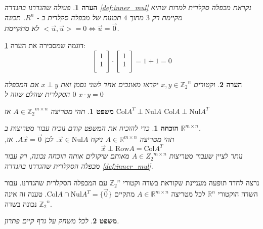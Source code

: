 \documentclass[12pt,leqno]{article}
\theoremstyle{theoremdd}
\newtheorem{theorem}{משפט}[section]
\newtheorem{comm}{הערה}[section]
\newtheorem*{prove}{הוכחה}
\newcommand{\Zn}{{\mathbb{Z}_2}^n}
\newcommand{\Col}{\mathrm{Col}}
\newcommand{\Nul}{\mathrm{Nul}}
\begin{document}
\begin{comm}
    \label{comm:not_really_inner_mul}
    פעולה שהגדרנו 
    בהגדרה 
    \ref{def:inner_mul}
    נקראת 
    מכפלה סקלרית
    למרות שהיא
    מקיימת רק 
    $3$
    מתוך 
    $4$
    תכונות של מכפלה סקלרית ב
    -
    $R^n$.   
    תכונה 
    $<\vec{u},\vec{u}> = 0 \Leftrightarrow \vec{u} = \vec{0} $
    לא מתקיימת.
\end{comm}
דוגמה 
שמסבירה את הערה
\ref{comm:not_really_inner_mul}:
\[
    \begin{bmatrix}
    1 \\
    1 \\
    \end{bmatrix}    
    \cdot 
    \begin{bmatrix}
    1 \\
    1 \\
    \end{bmatrix} 
    = 1 + 1 = 0
\]
\begin{comm}
    וקטורים 
    $x, y \in \Zn $
    יקראו מאונכים אחד לשני נסמן זאת 
    $x \perp  y$
    אם המכפלה הסקלרית שהלם שווה 
    ל
    $0$
    $x \cdot y = 0$
\end{comm}
\begin{theorem}
    \label{the: Nul A and Col AT}
    תהי מטריצה 
    $A \in {\mathbb{Z}_2}^{m \times n }$
    אז 
    $\Col A^T \perp \Nul A$
    $\Col A \perp \Nul A^T$
\end{theorem}
\begin{prove}
    כדי להוכיח את המשפט קודם 
    נוכיח 
    עבור מטריצות ב
    $\mathbb{R}^{m \times n}$.
    \\
    תהי 
    מטריצה
    $A \in \mathbb{R}^{m \times n}$
    ניקח 
    $\vec x \in \mathrm{Nul} A$.
    לכן
    $A\vec x=\vec 0$. 
    אז,
    \[
        \vec x \perp \mathrm{Row}A=\mathrm{Col} A^T
    \]
    נותר לציין 
    שעבור 
    מטריצות 
    $A \in {Z_2}^{m \times n}$
    מאותם שיקולים אותה הוכחה נכונה,
    רק עבור מכפלה הסקלרית שהגדרנו 
    בהגדרה 
    \ref{def:inner_mul}.
\end{prove}
נרצה לחדד תופעה מעניינת שקוראת בשדה וקטורי 
$\Zn$
עם המכפלה הסקלרית שהגדרנו.
עבור השדה הוקטורי 
$\mathbb{R}^n$
לכל מטריצה 
$A \in \mathbb{R}^{m \times n}$
מתקיים 
$\Col A \cap \Nul A^T = \{ \vec{0}\}$.
טענה זה אינה נכונה בשדה 
$\Zn$.
\begin{theorem}
    \label{thrm: clean game has solution}
    לכל משחק על גרף קיים פתרון.
\end{theorem}
\end{document}
